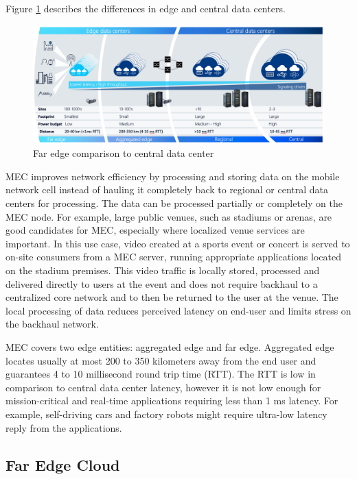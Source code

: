 Figure \ref{fig:AirFrame} describes the differences in edge and central data centers.  

\begin{figure}[ht]
  \begin{center}
    \includegraphics[width=13.5cm]{images/AirFrame.png}
    \caption{Far edge comparison to central data center \cite{AirFrameOpenEdgeServer}}
    \label{fig:AirFrame}
  \end{center}
\end{figure}

MEC improves network efficiency by processing and storing data on the mobile network cell instead of hauling it completely back to regional or central data centers for processing. The data can be processed partially or completely on the MEC node. For example, large public venues, such as stadiums or arenas, are good candidates for MEC, especially where localized venue services are important. In this use case, video created at a sports event or concert is served to on-site consumers from a MEC server, running appropriate applications located on the stadium premises. This video traffic is locally stored, processed and delivered directly to users at the event and does not require backhaul to a centralized core network and to then be returned to the user at the venue. The local processing of data reduces perceived latency on end-user and limits stress on the backhaul network. \cite{Brown2016}

MEC covers two edge entities: aggregated edge and far edge. Aggregated edge locates usually at most 200 to 350 kilometers away from the end user and guarantees 4 to 10 millisecond round trip time (RTT). The RTT is low in comparison to central data center latency, however it is not low enough for mission-critical and real-time applications requiring less than 1 ms latency. For example, self-driving cars and factory robots might require ultra-low latency reply from the applications.

\subsection{Far Edge Cloud}

